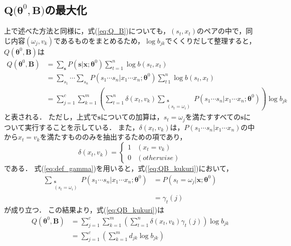 \documentclass[a4j]{jarticle}
\begin{document}
\subsection*{$\bm{Q(\theta}^{0}, \bm{B)}$の最大化}
上で述べた方法と同様に，式(\ref{eq:Q_B})についても，$(s_{t}, x_{t})$のペアの中で，同じ内容$(\omega_{j}, v_{k})$であるものをまとめるため，$\log b_{jk}$でくくりだして整理すると，$Q(\bm{\theta}^{0}, \bm{B})$は
\begin{align}
Q(\bm{\theta}^{0}, \bm{B}) & = \sum_{\bm{s}} P(\bm{s} | \mathbf{x}; \bm{\theta}^{0}) \sum_{t=1}^{n} \log b(s_{t}, x_{t}) \\
& = \sum_{s_{1}} \cdots \sum_{s_{n}} P(s_{1} \cdots s_{n} | x_{1} \cdots x_{n}; \bm{\theta}^{0}) \sum_{t~1}^{n} \log b(s_{t}, x_{t}) \\
& =  \sum_{j=1}^{c} \sum_{k=1}^{m} \left( \sum_{t=1}^{n} \delta (x_{t}, v_{k})  \sum_{\substack{\mathbf{s} \\ (s_{t} = \omega_{i})}} P(s_{1} \cdots s_{n} | x_{1} \cdots x_{n}; \bm{\theta}^{0}) \right) \log b_{jk} \label{eq:QB_kukuri}
\end{align}
と表される．
ただし，上式で$\bm{s}$についての加算は，$s_{t} = \omega_{j}$を満たすすべての$\bm{s}$について実行することを示している．
また，$\delta(x_{t}, v_{k})$は，$P(s_{1}\cdots s_{n} | x_{1} \cdots x_{n})$の中から$x_{t} = v_{k}$を満たすもののみを抽出するための項であり，
\begin{equation}
\delta(x_{t}, v_{k}) = \left\{ \begin{array}{ll}
1 & (x_{t} = v_{k}) \\
0 & \mathit{(otherwise)}
\end{array} \right.
\end{equation}
である．
式(\ref{eq:def_gamma})を用いると，式(\ref{eq:QB_kukuri})において，
\begin{align}
 \sum_{\substack{\mathbf{s} \\ (s_{t} = \omega_{i})}} P(s_{1} \cdots s_{n} | x_{1} \cdots x_{n}; \bm{\theta}^{0}) & = P(s_{t} = \omega_{j} | \mathbf{x}; \bm{\theta}^{0}) \\
 & = \gamma_{t}(j)
\end{align}
が成り立つ．
この結果より，式(\ref{eq:QB_kukuri})は
\begin{align}
	Q(\bm{\theta}^{0}, \bm{B}) & = \sum^{c}_{j=1} \sum^{m}_{k=1} \left( \sum_{t=1}^{n} \delta (x_{t}, v_{k}) \gamma_{t}(j) \right) \log b_{jk} \\
	& = \sum^{c}_{j=1} \left( \sum^{m}_{k=1} d_{jk} \log b_{jk} \right) \label{eq:QB_henkei_last}
\end{align}
\end{document}
